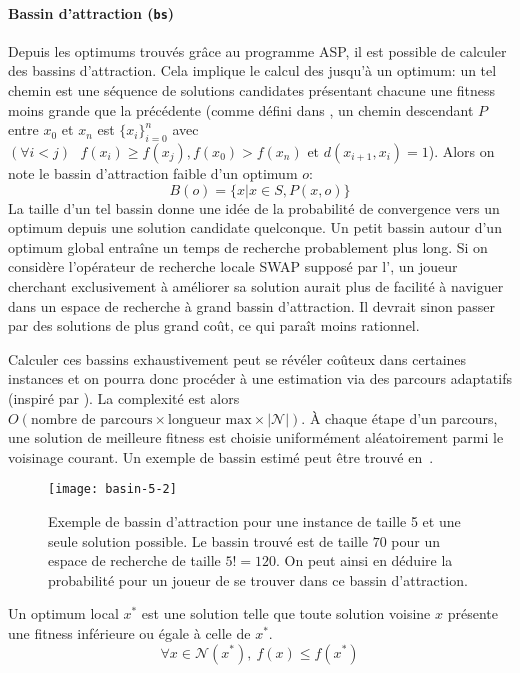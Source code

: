 \documentclass[../main.tex]{subfiles}
\begin{document}
	\paragraph{Bassin d'attraction (\texttt{bs})}{Depuis les optimums trouvés grâce au programme ASP, il est possible de calculer des bassins d'attraction. Cela implique le calcul des  jusqu'à un optimum: un tel chemin est une séquence de solutions candidates présentant chacune une fitness moins grande que la précédente (comme défini dans \cite{pitzer}, un chemin descendant $P$ entre $x_0$ et $x_n$ est $\{x_i\}_{i=0}^n$ avec $(\forall i < j)\text{ }f(x_i) \geq f(x_j), f(x_0) > f(x_n) \text{ et } d(x_{i+1}, x_i) = 1$). Alors on note le bassin d'attraction faible d'un optimum $o$:
	\begin{equation*}
	    B(o) = \{x | x \in S, P(x, o)\}
	\end{equation*}
La taille d'un tel bassin donne une idée de la probabilité de convergence vers un optimum depuis une solution candidate quelconque. Un petit bassin autour d'un optimum global entraîne un temps de recherche probablement plus long. Si on considère l'opérateur de recherche locale SWAP supposé par l', un joueur cherchant exclusivement à améliorer sa solution aurait plus de facilité à naviguer dans un espace de recherche à grand bassin d'attraction. Il devrait sinon passer par des solutions de plus grand coût, ce qui paraît moins rationnel.

Calculer ces bassins exhaustivement peut se révéler coûteux dans certaines instances et on pourra donc procéder à une estimation via des parcours adaptatifs (inspiré par \cite{garnier}). La complexité est alors $O(\text{nombre de parcours} \times \text{longueur max} \times |\mathcal{N}|)$. À chaque étape d'un parcours, une solution de meilleure fitness est choisie uniformément aléatoirement parmi le voisinage courant. Un exemple de bassin estimé peut être trouvé en~.

\begin{figure}[ht!]
    \centering
    \texttt{[image: basin-5-2]}
    \caption{Exemple de bassin d'attraction pour une instance de taille 5 et une seule solution possible. Le bassin trouvé est de taille $70$ pour un espace de recherche de taille $5! = 120$. On peut ainsi en déduire la probabilité pour un joueur de se trouver dans ce bassin d'attraction.}
    \label{fig-basin}
\end{figure}
	}
	
\begin{definition}
    Un optimum local $x^*$ est une solution telle que toute solution voisine $x$ présente une fitness inférieure ou égale à celle de $x^*$.
    \begin{equation*}
        \forall x \in \mathcal{N}(x^*),~f(x) \leq f(x^*)
    \end{equation*}
\end{definition}
\end{document}
